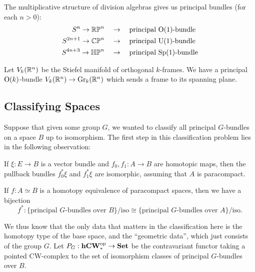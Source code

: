 \documentclass{article}
\begin{document}
\begin{example}
  The multiplicative structure of division algebras gives us principal bundles (for each $n>0$):
  \[
    \begin{aligned}
      S^n \to \mathbb{RP}^n \quad&\rightarrow\quad \textrm{principal }\mathrm{O}(1)\textrm{-bundle}\\
      S^{2n+1} \to \mathbb{CP}^n \quad&\rightarrow\quad \textrm{principal }\mathrm{U}(1)\textrm{-bundle}\\
      S^{4n+3} \to \mathbb{HP}^n \quad&\rightarrow\quad \textrm{principal }\mathrm{Sp}(1)\textrm{-bundle}\\
    \end{aligned}
  \]
\end{example}

\begin{example}
  Let $V_k(\mathbb{R}^n)$ be the Stiefel manifold of orthogonal $k$-frames. We have a principal $\mathrm{O}(k)$-bundle $V_k(\mathbb{R}^n) \to \mathrm{Gr}_k(\mathbb{R}^n)$ which sends a frame to its spanning plane.
\end{example}

\subsection{Classifying Spaces}

Suppose that given some group $G$, we wanted to classify all principal $G$-bundles on a space $B$ up to isomorphism. The first step in this classification problem lies in the following observation:

\begin{theorem}
  If $\xi : E \to B$ is a vector bundle and $f_0, f_1 : A \to B$ are homotopic maps, then the pullback bundles $f_0^*\xi$ and $f_1^*\xi$ are isomorphic, assuming that $A$ is paracompact.
\end{theorem}

\begin{corollary}
  If $f : A\simeq B$ is a homotopy equivalence of paracompact spaces, then we have a bijection
  \[
  f^* : \{\textrm{principal $G$-bundles over }B\}/\textrm{iso} \cong 
  \{\textrm{principal $G$-bundles over }A\}/\textrm{iso}. 
  \]
\end{corollary}

We thus know that the only data that matters in the classification here is the homotopy type of the base space, and the ``geometric data'', which just consists of the group $G$. Let $P_G : \mathbf{hCW}_*^{\mathrm{op}} \to \mathbf{Set}$ be the contravariant functor taking a pointed CW-complex to the set of isomorphism classes of principal $G$-bundles over $B$. 
\end{document}
